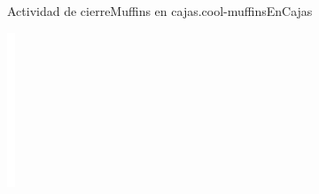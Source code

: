 \documentclass[14pt]{extarticle}
\begin{document}
\begin{project}{Actividad de cierre}{Muffins en cajas.}{cool-muffinsEnCajas}
\begin{image}{0}{1}{0}{}
\includegraphics[max width=\linewidth, center]{external/whitespace-tikz/3cm.pdf}
\end{image}%
\end{project}
\end{document}

